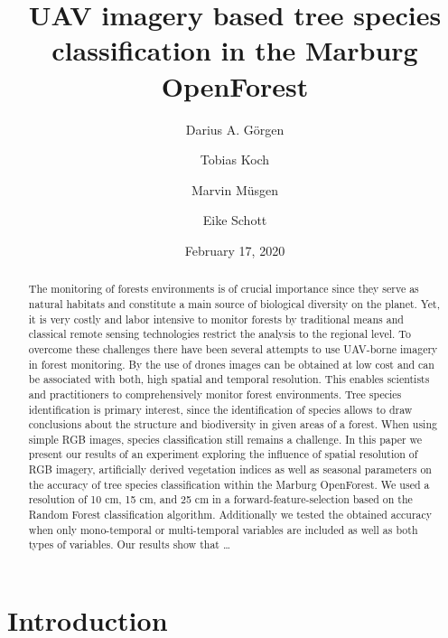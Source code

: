 \documentclass[]{article}
\title{UAV imagery based tree species classification in the Marburg OpenForest}
\author{Darius A. Görgen \and Tobias Koch \and Marvin Müsgen \and Eike Schott}
\date{February 17, 2020}
\begin{document}
\maketitle
\begin{abstract}
The monitoring of forests environments is of crucial importance since
they serve as natural habitats and constitute a main source of
biological diversity on the planet. Yet, it is very costly and labor
intensive to monitor forests by traditional means and classical remote
sensing technologies restrict the analysis to the regional level. To
overcome these challenges there have been several attempts to use
UAV-borne imagery in forest monitoring. By the use of drones images can
be obtained at low cost and can be associated with both, high spatial
and temporal resolution. This enables scientists and practitioners to
comprehensively monitor forest environments. Tree species identification
is primary interest, since the identification of species allows to draw
conclusions about the structure and biodiversity in given areas of a
forest. When using simple RGB images, species classification still
remains a challenge. In this paper we present our results of an
experiment exploring the influence of spatial resolution of RGB imagery,
artificially derived vegetation indices as well as seasonal parameters
on the accuracy of tree species classification within the Marburg
OpenForest. We used a resolution of 10 cm, 15 cm, and 25 cm in a
forward-feature-selection based on the Random Forest classification
algorithm. Additionally we tested the obtained accuracy when only
mono-temporal or multi-temporal variables are included as well as both
types of variables. Our results show that \ldots{}
\end{abstract}

{
\setcounter{tocdepth}{2}
\tableofcontents
}
\hypertarget{introduction}{%
\section{Introduction}\label{introduction}}
\end{document}
